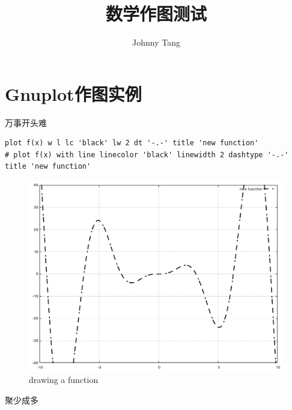 \documentclass[cn,hazy,black,10pt,normal]{elegantnote}
\title{数学作图测试}
\author{Johnny Tang}
\institute{DEEP Team}
\date{\zhtoday}
\begin{document}
\maketitle

\chapter{Gnuplot作图实例}

万事开头难

\begin{lstlisting}
plot f(x) w l lc 'black' lw 2 dt '-.-' title 'new function'
# plot f(x) with line linecolor 'black' linewidth 2 dashtype '-.-' title 'new function'
\end{lstlisting}

\begin{figure}[h!]
	\centering
	\includegraphics[width=12cm]{attachment/202304201.pdf}
	\caption{drawing a function}
\end{figure}

聚少成多
\end{document}
